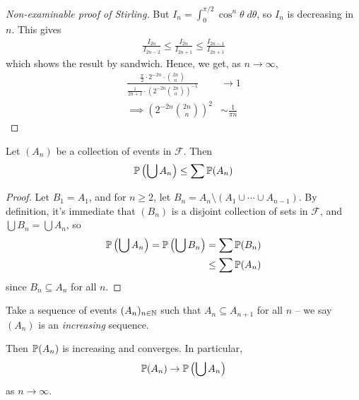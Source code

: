\documentclass{../template/note}
\begin{document}
\begin{proof}[Non-examinable proof of Stirling]
        But \(I_n = \int_0^{\pi/2} \cos^n \theta \; d\theta\), so \(I_n\) is decreasing in \(n\). This gives
        \begin{align*}
            \frac{I_{2n}}{I_{2n-2}} \leq \frac{I_{2n}}{I_{2n+1}} \leq \frac{I_{2n-1}}{I_{2n+1}}
        \end{align*}
        which shows the result by sandwich. Hence, we get, as \(n \to \infty\),
        \begin{align*}
            \frac{\frac{\pi}2 \cdot 2^{-2n} \cdot \binom{2n}{n}}{\frac{1}{2n+1} \cdot \left(2^{-2n} \binom{2n}{n}\right)^{-1}} &\to 1 \\ \implies \left(2^{-2n} \binom{2n}{n}\right)^2 &\sim \frac{1}{\pi n}
        \end{align*}        
    \end{proof}
    
    \begin{proposition}
        Let \((A_n)\) be a collection of events in \(\mathcal F\). Then
        \begin{align*}
            \mathbb P\left(\bigcup A_n\right) \leq \sum \mathbb P(A_n)
        \end{align*}
    \end{proposition}
    
    \begin{proof}
        Let \(B_1 = A_1\), and for \(n \geq 2\), let \(B_n = A_n \setminus (A_1 \cup \cdots \cup A_{n-1})\). By definition, it's immediate that \((B_n)\) is a disjoint collection of sets in \(\mathcal F\), and \(\bigcup B_n = \bigcup A_n\), so
        \begin{align*}
            \mathbb P\left(\bigcup A_n\right) = \mathbb P\left(\bigcup B_n\right) &= \sum \mathbb P(B_n) \\
            &\leq \sum \mathbb P(A_n)
        \end{align*}
        since \(B_n \subseteq A_n\) for all \(n\).
    \end{proof}
    
    \begin{proposition}
        \label{continuity}
        Take a sequence of events \((A_n)_{n \in \mathbb N}\) such that \(A_n \subseteq A_{n+1}\) for all \(n\) -- we say \((A_n)\) is an \emph{increasing} sequence.

        Then \(\mathbb P(A_n)\) is increasing and converges. In particular,
        \begin{align*}
            \mathbb P(A_n) \to \mathbb P\left(\bigcup A_n\right)
        \end{align*}
        as \(n \to \infty\).
    \end{proposition}
    
\end{document}

